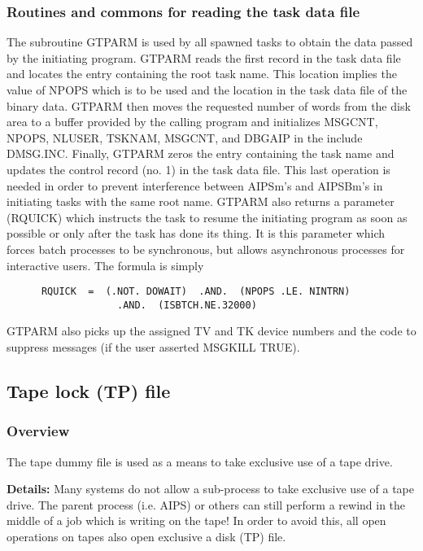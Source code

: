 \subsubsection{Routines and commons for reading the task data file}

     The subroutine GTPARM is used by all spawned tasks
to obtain the data passed by the initiating program.  GTPARM reads the
first record in the task data file and locates the entry containing
the root task name.  This location implies the value of NPOPS which is
to be used and the location in the task data file of the binary data.
GTPARM then moves the requested number of words from the disk area to
a buffer provided by the calling program and initializes MSGCNT,
NPOPS, NLUSER, TSKNAM, MSGCNT, and DBGAIP in the include DMSG.INC.
Finally, GTPARM zeros the entry containing the task name and updates
the control record (no. 1) in the task data file.  This last operation
is needed in order to prevent interference between AIPSm's and
AIPSBm's in initiating tasks with the same root name.  GTPARM also
returns a parameter (RQUICK) which instructs the task to resume the
initiating program as soon as possible or only after the task has done
its thing.  It is this parameter which forces batch processes to be
synchronous, but allows asynchronous processes for interactive users.
The formula is simply

\begin{verbatim}
      RQUICK  =  (.NOT. DOWAIT)  .AND.  (NPOPS .LE. NINTRN)
                   .AND.  (ISBTCH.NE.32000)
\end{verbatim}

GTPARM also picks up the assigned TV and TK device numbers and the code
to suppress messages (if the user asserted MSGKILL TRUE).

\subsection{Tape lock (TP) file}
\subsubsection{Overview}

  The tape dummy file is used  as a means to take exclusive use of a
tape drive.

{\bf Details:}  Many systems do not allow
a sub-process to take exclusive use of a tape drive.  The parent
process (i.e. AIPS) or others can still perform a rewind in the middle of a job
which is writing on the tape!  In order to avoid this, all open
operations on tapes also open exclusive a disk (TP) file.

